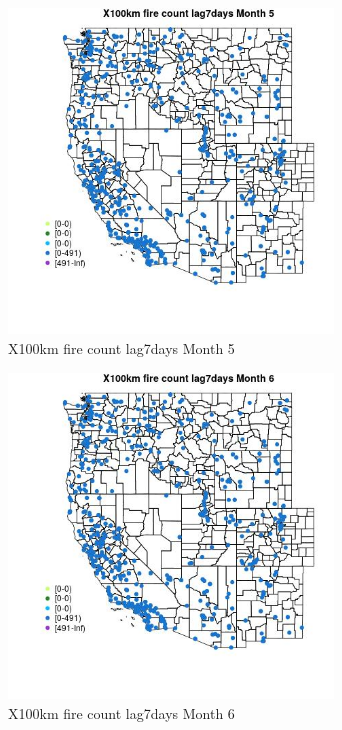 \begin{figure} 
\centering  
\includegraphics[width=0.77\textwidth]{Code_Outputs/Report_ML_input_PM25_Step4_part_e_de_duplicated_aves_compiled_2019-05-14wNAs_MapObsMo5X100km_fire_count_lag7days.jpg} 
\caption{\label{fig:Report_ML_input_PM25_Step4_part_e_de_duplicated_aves_compiled_2019-05-14wNAsMapObsMo5X100km_fire_count_lag7days}X100km fire count lag7days Month 5} 
\end{figure} 
 

\clearpage 

\begin{figure} 
\centering  
\includegraphics[width=0.77\textwidth]{Code_Outputs/Report_ML_input_PM25_Step4_part_e_de_duplicated_aves_compiled_2019-05-14wNAs_MapObsMo6X100km_fire_count_lag7days.jpg} 
\caption{\label{fig:Report_ML_input_PM25_Step4_part_e_de_duplicated_aves_compiled_2019-05-14wNAsMapObsMo6X100km_fire_count_lag7days}X100km fire count lag7days Month 6} 
\end{figure} 
 

